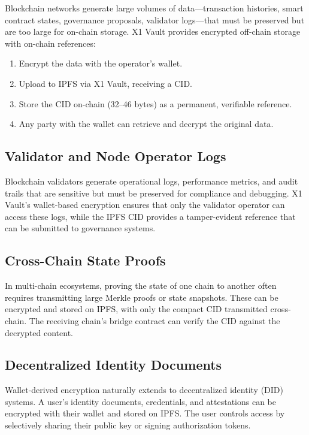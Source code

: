 \documentclass[11pt,a4paper]{article}
\begin{document}
Blockchain networks generate large volumes of data---transaction histories, smart contract states, governance proposals, validator logs---that must be preserved but are too large for on-chain storage. X1 Vault provides encrypted off-chain storage with on-chain references:

\begin{enumerate}
    \item Encrypt the data with the operator's wallet.
    \item Upload to IPFS via X1 Vault, receiving a CID.
    \item Store the CID on-chain (32--46 bytes) as a permanent, verifiable reference.
    \item Any party with the wallet can retrieve and decrypt the original data.
\end{enumerate}

\subsection{Validator and Node Operator Logs}

Blockchain validators generate operational logs, performance metrics, and audit trails that are sensitive but must be preserved for compliance and debugging. X1 Vault's wallet-based encryption ensures that only the validator operator can access these logs, while the IPFS CID provides a tamper-evident reference that can be submitted to governance systems.

\subsection{Cross-Chain State Proofs}

In multi-chain ecosystems, proving the state of one chain to another often requires transmitting large Merkle proofs or state snapshots. These can be encrypted and stored on IPFS, with only the compact CID transmitted cross-chain. The receiving chain's bridge contract can verify the CID against the decrypted content.

\subsection{Decentralized Identity Documents}

Wallet-derived encryption naturally extends to decentralized identity (DID) systems. A user's identity documents, credentials, and attestations can be encrypted with their wallet and stored on IPFS. The user controls access by selectively sharing their public key or signing authorization tokens.
\end{document}
